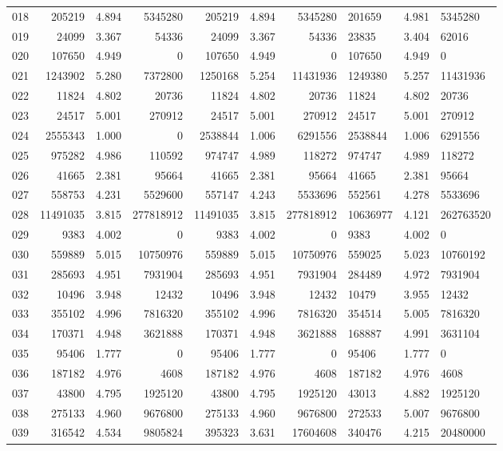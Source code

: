 \begin{longtable}{crrrrrr}
018 & 205219 & 4.894 & 5345280 & 205219 & 4.894 & 5345280 & 201659 & 4.981 & 5345280 \\
019 & 24099 & 3.367 & 54336 & 24099 & 3.367 & 54336 & 23835 & 3.404 & 62016 \\
020 & 107650 & 4.949 & 0 & 107650 & 4.949 & 0 & 107650 & 4.949 & 0 \\
021 & 1243902 & 5.280 & 7372800 & 1250168 & 5.254 & 11431936 & 1249380 & 5.257 & 11431936 \\
022 & 11824 & 4.802 & 20736 & 11824 & 4.802 & 20736 & 11824 & 4.802 & 20736 \\
023 & 24517 & 5.001 & 270912 & 24517 & 5.001 & 270912 & 24517 & 5.001 & 270912 \\
024 & 2555343 & 1.000 & 0 & 2538844 & 1.006 & 6291556 & 2538844 & 1.006 & 6291556 \\
025 & 975282 & 4.986 & 110592 & 974747 & 4.989 & 118272 & 974747 & 4.989 & 118272 \\
026 & 41665 & 2.381 & 95664 & 41665 & 2.381 & 95664 & 41665 & 2.381 & 95664 \\
027 & 558753 & 4.231 & 5529600 & 557147 & 4.243 & 5533696 & 552561 & 4.278 & 5533696 \\
028 & 11491035 & 3.815 & 277818912 & 11491035 & 3.815 & 277818912 & 10636977 & 4.121 & 262763520 \\
029 & 9383 & 4.002 & 0 & 9383 & 4.002 & 0 & 9383 & 4.002 & 0 \\
030 & 559889 & 5.015 & 10750976 & 559889 & 5.015 & 10750976 & 559025 & 5.023 & 10760192 \\
031 & 285693 & 4.951 & 7931904 & 285693 & 4.951 & 7931904 & 284489 & 4.972 & 7931904 \\
032 & 10496 & 3.948 & 12432 & 10496 & 3.948 & 12432 & 10479 & 3.955 & 12432 \\
033 & 355102 & 4.996 & 7816320 & 355102 & 4.996 & 7816320 & 354514 & 5.005 & 7816320 \\
034 & 170371 & 4.948 & 3621888 & 170371 & 4.948 & 3621888 & 168887 & 4.991 & 3631104 \\
035 & 95406 & 1.777 & 0 & 95406 & 1.777 & 0 & 95406 & 1.777 & 0 \\
036 & 187182 & 4.976 & 4608 & 187182 & 4.976 & 4608 & 187182 & 4.976 & 4608 \\
037 & 43800 & 4.795 & 1925120 & 43800 & 4.795 & 1925120 & 43013 & 4.882 & 1925120 \\
038 & 275133 & 4.960 & 9676800 & 275133 & 4.960 & 9676800 & 272533 & 5.007 & 9676800 \\
039 & 316542 & 4.534 & 9805824 & 395323 & 3.631 & 17604608 & 340476 & 4.215 & 20480000 \\

\end{longtable}
